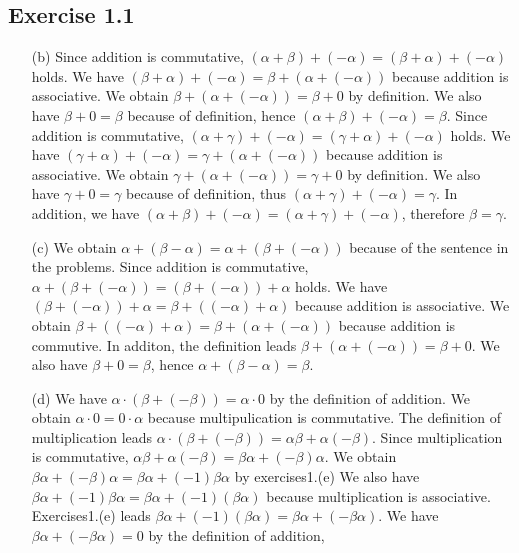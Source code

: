 \documentclass{article}
\begin{document}
\subsection{Exercise 1.1}
\begin{itemize}
  \item[(b)]Since addition is commutative, $(\alpha + \beta) + (-\alpha) = (\beta + \alpha) + (-\alpha)$ holds.
    We have $(\beta + \alpha) + (-\alpha) = \beta + (\alpha + (-\alpha))$ because addition is associative.
    We obtain $\beta + (\alpha + (-\alpha)) = \beta + 0$ by definition.
    We also have $\beta + 0 = \beta$ because of definition,
    hence $(\alpha + \beta) + (-\alpha) = \beta$.
    Since addition is commutative, $(\alpha + \gamma) + (-\alpha) = (\gamma + \alpha) + (-\alpha)$ holds.
    We have $(\gamma + \alpha) + (-\alpha) = \gamma + (\alpha + (-\alpha))$ because addition is associative.
    We obtain $\gamma + (\alpha + (-\alpha)) = \gamma + 0$ by definition.
    We also have $\gamma + 0 = \gamma$ because of definition,
    thus $(\alpha + \gamma) + (-\alpha) = \gamma$.
    In addition, we have $(\alpha + \beta) + (-\alpha) = (\alpha + \gamma) + (-\alpha)$,
    therefore $\beta = \gamma$.
  \item[(c)]We obtain $\alpha + (\beta - \alpha) = \alpha + (\beta + (-\alpha))$ because of the sentence in the problems.
    Since addition is commutative, $\alpha + (\beta + (-\alpha)) = (\beta + (-\alpha)) + \alpha$ holds.
    We have $(\beta + (-\alpha)) + \alpha = \beta + ((-\alpha) + \alpha)$ because addition is associative.
    We obtain $\beta + ((-\alpha) + \alpha) = \beta + (\alpha + (-\alpha))$ because addition is commutive.
    In additon, the definition leads $\beta + (\alpha + (-\alpha)) = \beta + 0$.
    We also have $\beta + 0 = \beta$,
    hence $\alpha + (\beta - \alpha) = \beta$.
  \item[(d)]
    We have $\alpha\cdot(\beta + (-\beta)) = \alpha\cdot0$ by the definition of addition.
    We obtain $\alpha\cdot0 = 0\cdot\alpha$ because multipulication is commutative.
    The definition of multiplication leads $\alpha\cdot(\beta + (-\beta)) = \alpha\beta + \alpha(-\beta)$.
    Since multiplication is commutative, $\alpha\beta + \alpha(-\beta) = \beta\alpha + (-\beta)\alpha$.
    We obtain $\beta\alpha + (-\beta)\alpha = \beta\alpha + (-1)\beta\alpha$ by exercises1.(e)
    We also have $\beta\alpha + (-1)\beta\alpha = \beta\alpha + (-1)(\beta\alpha)$ because multiplication is associative.
    Exercises1.(e) leads $\beta\alpha + (-1)(\beta\alpha) = \beta\alpha + (-\beta\alpha)$.
    We have $\beta\alpha + (-\beta\alpha) = 0$ by the definition of addition,

\end{itemize}
\end{document}
